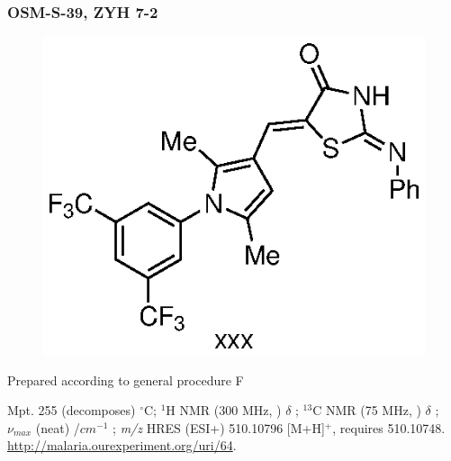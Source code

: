 \documentclass[12pt, a4paper,titlepage]{article}
\begin{document}
{\subsubsection*{OSM-S-39, ZYH 7-2}
\label{exp:ZYH7}
	\begin{figure}[H]
	\begin{center}
	\includegraphics{exp/ZYH7.eps}
	\end{center}
	\vspace{-25pt}	
	\end{figure}

Prepared according to general procedure F


Mpt. 255 (decomposes) $^\circ$C; 
$^1$H NMR (300 MHz, ) $\delta$ ; 
  $^{13}$C NMR (75 MHz, ) $\delta$ ; 
 $\nu_{max}$ (neat) /$cm^{-1}$ ; 
\emph{m/z} HRES (ESI+) 510.10796 [M+H]$^+$,  requires 510.10748.
\url{http://malaria.ourexperiment.org/uri/64}. 

}
\end{document}
